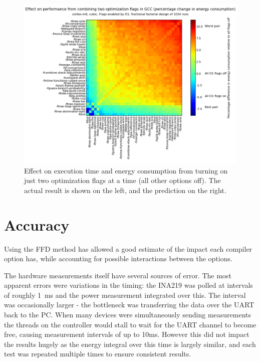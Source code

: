 \documentclass[twocolumn]{article}
\newcommand{\nsection}[1]{\section{\bfseries #1}}
\let\oldcaption\caption
\renewcommand{\caption}[1]{\oldcaption{\textup{#1}}}
\begin{document}
\begin{figure}
\begin{minipage}[l]{0.07\columnwidth}
    \end{minipage}
    \hfill
    \begin{minipage}[r]{0.95\columnwidth}
        \centering
		\includegraphics[width=0.9\linewidth, clip, trim= 8.8cm 0 7cm 2cm]{cortex-m0/o1cub_-7p5_10_pred.png}
    \end{minipage}
    \caption{Effect on execution time and energy consumption from turning on just two optimization flags at a time (all other options off). The actual result is shown on the left, and the prediction on the right.}
    \label{Fig:twoway_cubic}
\end{figure}


\nsection{Accuracy}

Using the FFD method has allowed a good estimate of the impact each compiler option has, while accounting for possible interactions between the options.

The hardware measurements itself have several sources of error. The most apparent errors were variations in the timing: the INA219 was polled at intervals of roughly 1~ms and the power measurement integrated over this. The interval was occasionally larger - the bottleneck was transferring the data over the UART back to the PC. When many devices were simultaneously sending measurements the threads on the controller would stall to wait for the UART channel to become free, causing measurement intervals of up to 10ms. However this did not impact the results hugely as the energy integral over this time is largely similar, and each test was repeated multiple times to ensure consistent results.
\end{document}
